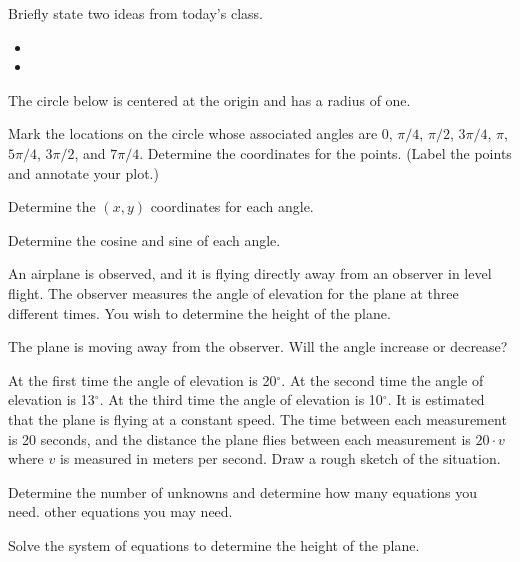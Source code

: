 \begin{problem}
\item Briefly state two ideas from today's class.
  \begin{itemize}
  \item
  \item
  \end{itemize}
  \item The circle below is centered at the origin and has a radius of
    one.


    \begin{subproblem}
    \item Mark the locations on the circle whose associated angles are
      0, $\pi/4$, $\pi/2$, $3\pi/4$, $\pi$, $5\pi/4$, $3\pi/2$, and
      $7\pi/4$.
      Determine the coordinates for the points.
      (Label the points and annotate your plot.)
    \item Determine the $(x,y)$ coordinates for each angle.
    \item Determine the cosine and sine of each angle.
    \end{subproblem}
  \item An airplane is observed, and it is flying directly away from an observer
      in level flight.
      The observer measures the angle of elevation for the plane at three different
      times. You wish to determine the height of the plane.
      \begin{subproblem}
        \item The plane is moving away from the observer. Will the angle increase
          or decrease?
        \item At the first time the angle of elevation is 20$^\circ$.
          At the second time the angle of elevation is 13$^\circ$.
          At the third time the angle of elevation is 10$^\circ$.
          It is estimated that the plane is flying at a constant speed.
          The time between each measurement is 20 seconds, and the distance
          the plane flies between each measurement is $20\cdot v$ where $v$
          is measured in meters per second.
          Draw a rough sketch of the situation.
          \vfill
          \item Determine the number of unknowns and determine how many equations you need.
            \vspace{1em}
          other equations you may need.
          \vfill
        \item Solve the system of equations to determine the height of the plane.
          \vfill
          \vfill
      \end{subproblem}
\end{problem}


